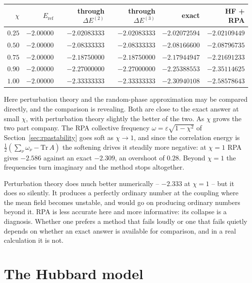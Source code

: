 \begin{center}
\renewcommand{\arraystretch}{1.2}
\setlength{\tabcolsep}{10pt}
\begin{tabular}{rrrrrr}
\toprule
$\chi$ & $E_{\mathrm{ref}}$ & through $\Delta E^{(2)}$
  & through $\Delta E^{(3)}$ & exact & HF + RPA\\
\midrule
$0.25$ & $-2.00000$ & $-2.02083333$ & $-2.02083333$ & $-2.02072594$
  & $-2.02109449$\\
$0.50$ & $-2.00000$ & $-2.08333333$ & $-2.08333333$ & $-2.08166600$
  & $-2.08796735$\\
$0.75$ & $-2.00000$ & $-2.18750000$ & $-2.18750000$ & $-2.17944947$
  & $-2.21691233$\\
$0.90$ & $-2.00000$ & $-2.27000000$ & $-2.27000000$ & $-2.25388553$
  & $-2.35114625$\\
$1.00$ & $-2.00000$ & $-2.33333333$ & $-2.33333333$ & $-2.30940108$
  & $-2.58578643$\\
\bottomrule
\end{tabular}
\end{center}

Here perturbation theory and the random-phase approximation may be compared
directly, and the comparison is revealing.  Both are close to the exact
answer at small $\chi$, with perturbation theory slightly the better of the
two.  As $\chi$ grows the two part company.  The RPA collective frequency
$\omega=\varepsilon\sqrt{1-\chi^2}$ of Section~\ref{sec:rpastability} goes
soft as $\chi\to1$, and since the correlation energy is
$\tfrac12(\sum_{\nu}\omega_{\nu}-\mathrm{Tr}\,A)$ the softening drives it
steadily more negative: at $\chi=1$ RPA gives $-2.586$ against an exact
$-2.309$, an overshoot of $0.28$.  Beyond $\chi=1$ the frequencies turn
imaginary and the method stops altogether.

Perturbation theory does much better numerically -- $-2.333$ at $\chi=1$ --
but it does so silently.  It produces a perfectly ordinary number at the
coupling where the mean field becomes unstable, and would go on producing
ordinary numbers beyond it.  RPA is less accurate here and more informative:
its collapse is a diagnosis.  Whether one prefers a method that fails loudly
or one that fails quietly depends on whether an exact answer is available for
comparison, and in a real calculation it is not.

\section{The Hubbard model}
\label{sec:mbpthubbard}

